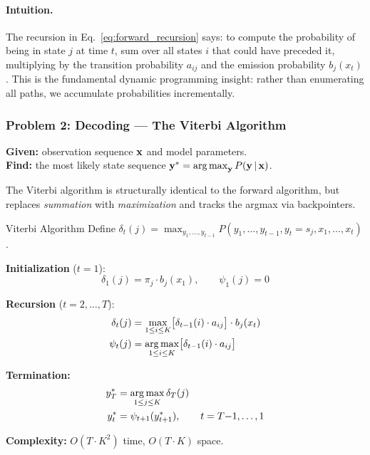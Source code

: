 \paragraph{Intuition.}  The recursion in Eq.~\eqref{eq:forward_recursion}
says: to compute the probability of being in state $j$ at time $t$, sum
over all states $i$ that could have preceded it, multiplying by the
transition probability $a_{ij}$ and the emission probability $b_j(x_t)$.
This is the fundamental dynamic programming insight: rather than enumerating
all paths, we accumulate probabilities incrementally.

\subsubsection{Problem 2: Decoding --- The Viterbi Algorithm}

\textbf{Given:} observation sequence $\mathbf{x}$ and model parameters.\\
\textbf{Find:} the most likely state sequence
$\mathbf{y}^* = \operatorname*{arg\,max}_{\mathbf{y}} P(\mathbf{y} \,|\, \mathbf{x})$.

The Viterbi algorithm is structurally identical to the forward algorithm,
but replaces \emph{summation} with \emph{maximization} and tracks the
argmax via backpointers.

\begin{mathresult}{Viterbi Algorithm}
Define $\delta_t(j) = \max_{y_1, \ldots, y_{t-1}} P(y_1, \ldots, y_{t-1}, y_t = s_j, x_1, \ldots, x_t)$.

\textbf{Initialization} ($t = 1$):
\begin{equation}
\delta_1(j) = \pi_j \cdot b_j(x_1), \qquad \psi_1(j) = 0
\end{equation}

\textbf{Recursion} ($t = 2, \ldots, T$):
\begin{align}
\delta_t(j) &= \max_{1 \leq i \leq K} \bigl[\delta_{t-1}(i) \cdot a_{ij}\bigr] \cdot b_j(x_t) \label{eq:viterbi_recursion} \\
\psi_t(j) &= \operatorname*{arg\,max}_{1 \leq i \leq K} \bigl[\delta_{t-1}(i) \cdot a_{ij}\bigr] \label{eq:viterbi_backpointer}
\end{align}

\textbf{Termination:}
\begin{align}
y_T^* &= \operatorname*{arg\,max}_{1 \leq j \leq K} \delta_T(j) \\
y_t^* &= \psi_{t+1}(y_{t+1}^*), \qquad t = T{-}1, \ldots, 1
\end{align}

\textbf{Complexity:} $O(T \cdot K^2)$ time, $O(T \cdot K)$ space.
\end{mathresult}

